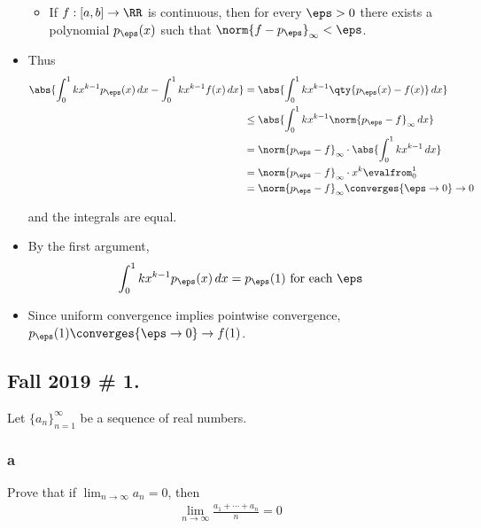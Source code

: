\begin{solution}
\begin{itemize}
  \begin{itemize}
  \tightlist
  \item
    If \(f: [a, b] \to \RR\) is continuous, then for every \(\eps>0\)
    there exists a polynomial \(p_\eps(x)\) such that
    \(\norm{f - p_\eps}_\infty < \eps\).
  \end{itemize}
\item
  Thus
  \begin{align*}
  \abs{ \int_0^1 kx^{k-1} p_\eps(x)\,dx - \int_0^1 kx^{k-1}f(x)\,dx  } 
  &= \abs{ \int_0^1 kx^{k-1} \qty{p_\eps(x) - f(x)} \,dx  } \\
  &\leq \abs{ \int_0^1 kx^{k-1} \norm{p_\eps-f}_\infty \,dx  } \\
  &= \norm{p_\eps-f}_\infty \cdot \abs{ \int_0^1 kx^{k-1} \,dx  } \\
  &= \norm{p_\eps-f}_\infty \cdot x^k \evalfrom_0^1 \\
  &= \norm{p_\eps-f}_\infty \converges{\eps\to 0}\to 0
  \end{align*}

  and the integrals are equal.
\item
  By the first argument,
  \begin{align*}\int_0^1 kx^{k-1} p_\eps(x) \,dx = p_\eps(1) \text{ for each } \eps\end{align*}
\item
  Since uniform convergence implies pointwise convergence,
  \(p_\eps(1) \converges{\eps\to 0}\to f(1)\).
\end{itemize}

\end{solution}

\hypertarget{fall-2019-1.}{%
\subsection{Fall 2019 \# 1.}\label{fall-2019-1.}}

Let \(\{a_n\}_{n=1}^\infty\) be a sequence of real numbers.

\hypertarget{a}{%
\subsubsection{a}\label{a}}

Prove that if \(\displaystyle\lim_{n→∞} a_n = 0\), then
\begin{align*}
\lim _{n \rightarrow \infty} \frac{a_{1}+\cdots+a_{n}}{n}=0
\end{align*}

